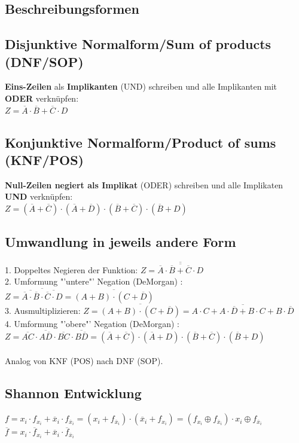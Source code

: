 \documentclass[6pt,a4paper]{scrartcl}
\newcommand{\ol}[1]{\ensuremath{\overline{#1}}}									%
\begin{document}
\begin{multicols*}{3}
\section{Beschreibungsformen}
	\subsection{Disjunktive Normalform/Sum of products (DNF/SOP)}
	\textbf{Eins-Zeilen} als \textbf{Implikanten} (UND) schreiben und alle Implikanten mit \textbf{ODER} verknüpfen: \\
	$Z = \overline A \cdot \overline B + \overline C \cdot D$ 
	
	\subsection{Konjunktive Normalform/Product of sums (KNF/POS)}
	\textbf{Null-Zeilen negiert als Implikat} (ODER)  schreiben und alle Implikaten \textbf{UND} verknüpfen: \\	
	$Z = ( \ol A + \ol C) \cdot ( \ol A + \ol D) \cdot ( \ol B + \ol C) \cdot ( \ol B + D)$
	
	\subsection{Umwandlung in jeweils andere Form}
	1. Doppeltes Negieren der Funktion: $ Z = \overline {\overline{\overline A \cdot \overline B + \overline C \cdot D}}$\\
	2. Umformung "'untere"'  Negation (DeMorgan) : $ Z = \ol{\ol{\ol A \cdot \ol B} \cdot \ol{\ol C \cdot D}} = \ol{(A+B) \cdot (C+\ol D)}$\\
	3. Ausmultiplizieren: $ Z = \ol{(A+B) \cdot (C+\ol D)} = \ol{A\cdot C + A\cdot \ol D + B \cdot C + B \cdot \ol D}$\\
	4. Umformung "'obere"'  Negation (DeMorgan) :\\ $ Z= \ol{AC} \cdot \ol{A \ol D} \cdot \ol{BC} \cdot \ol{B\ol D} = ( \ol A + \ol C) \cdot ( \ol A + D) \cdot ( \ol B + \ol C) \cdot ( \ol B + D)$\\ \\
	Analog von KNF (POS) nach DNF (SOP).
	
	\subsection{Shannon Entwicklung}
		$f = x_i \cdot f_{x_i} + \ol x_i \cdot f_{\ol x_i} = (x_i + f_{\ol x_i})\cdot ( \ol x_i + f_{x_i}) = (f_{x_i} \oplus f_{\ol x_i}) \cdot x_i \oplus f_{\ol x_i}$ \\
		$\ol f = x_i \cdot \ol f_{x_i} + \ol x_i \cdot \ol f_{\ol x_i}$


\end{multicols*}
\end{document}
